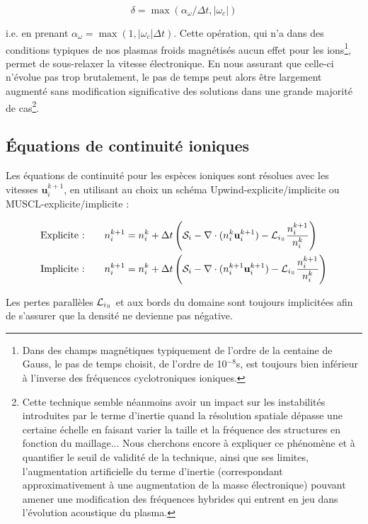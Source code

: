 \begin{refsection}
\begin{equation}
\delta=\max(\alpha_\omega/\Delta t,|\omega_c|)
\end{equation}

i.e. en prenant $\alpha_\omega=\max(1,|\omega_c|\Delta t)$.
Cette opération, qui n'a dans des conditions typiques de nos plasmas froids
magnétisés aucun effet pour les ions\footnote{Dans des champs magnétiques
typiquement de l'ordre de la centaine de Gauss, le pas de temps choisit, de l'ordre de 10$^{-8}$s, est toujours bien
inférieur à l'inverse des fréquences cyclotroniques ioniques.}, permet de
sous-relaxer la vitesse électronique. En nous assurant
que celle-ci n'évolue pas trop brutalement, le pas de temps peut alors être
largement augmenté sans modification significative des solutions dans une
grande majorité de cas\footnote{Cette
technique semble néanmoins avoir un impact sur les
instabilités introduites par le terme d'inertie quand la résolution spatiale
dépasse une certaine échelle en faisant varier la taille et la fréquence des
structures en fonction du maillage...
Nous cherchons encore à expliquer ce phénomène et à quantifier le seuil de
validité de la technique, ainsi que ses limites, l'augmentation artificielle du
terme d'inertie (correspondant approximativement à une augmentation de la masse
électronique) pouvant amener une modification des fréquences hybrides qui entrent en jeu dans
l'évolution acoustique du plasma.}.

\subsection{Équations de continuité ioniques}
Les équations de continuité pour les espèces ioniques sont résolues avec les
vitesses $\mathbf u_i^{k+1}$, en utilisant au choix un schéma
Upwind-explicite/implicite ou MUSCL-explicite/implicite :

\begin{align}
\text{Explicite :\qquad}& n_i^{k+1}=n_i^{k}+\Delta
t\left(\mathcal S_i-\nabla\cdot(n_i^{k}\mathbf
u_i^{k+1})-\mathcal L_{i_\para}\frac{n_i^{k+1}}{n_i^k}\right)\\
\text{Implicite :\qquad}&n_i^{k+1}=n_i^{k}+\Delta
t\left(\mathcal S_i-\nabla\cdot(n_i^{k+1}\mathbf
u_i^{k+1})-\mathcal L_{i_\para}\frac{n_i^{k+1}}{n_i^k}\right)
\end{align}

Les pertes parallèles $\mathcal {L}_{i_\para}$ et aux bords du
domaine sont toujours implicitées afin de s'assurer que la densité ne devienne
pas négative.


\end{refsection}
